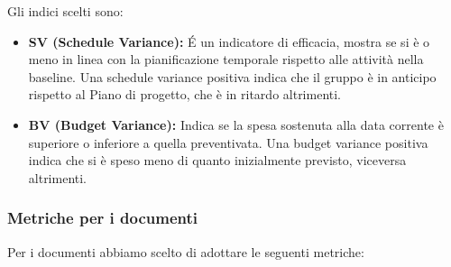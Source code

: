 \documentclass[a4paper]{article}
\begin{document}
				Gli indici scelti sono:
				\begin{itemize}
					\item \textbf{SV (Schedule Variance):} É un indicatore di efficacia, mostra se si è o meno in linea con la
					pianificazione temporale rispetto alle attività nella baseline. Una schedule variance positiva indica che il
					gruppo è in anticipo rispetto al Piano di progetto, che è in ritardo altrimenti.
					\item \textbf{BV (Budget Variance):} Indica se la spesa sostenuta alla data corrente è superiore o inferiore a
					quella preventivata. Una budget variance positiva indica che si è speso meno di quanto inizialmente previsto,
					viceversa altrimenti.		
				\end{itemize}
				
				
			\subsubsection{Metriche per i documenti}
				Per i documenti abbiamo scelto di adottare le seguenti metriche: 
				
\end{document}
